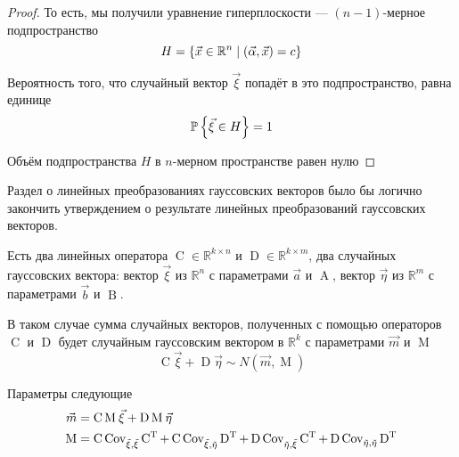 \begin{proof}
    То есть, мы получили уравнение гиперплоскости ---
    $\left( n-1 \right)$-мерное подпространство
    $$H = \left\{ \vec{x} \in \mathbb{R}^n
        \;\middle|\; \left( \vec{\alpha}, \vec{x} \right) = c \right\}$$

    Вероятность того, что случайный вектор $\vec{\xi}$ попадёт в это
    подпространство, равна единице
    $$\mathbb{P}\left\{ \vec{\xi} \in H \right\} = 1$$

    Объём подпространства $H$ в $n$-мерном пространстве равен нулю
\end{proof}

Раздел о линейных преобразованиях гауссовских векторов было бы логично закончить
утверждением о результате линейных преобразований гауссовских векторов.

\begin{affirmation}\label{affirmation:gaussianVector:linearTransformations}
    Есть два линейных оператора $\operatorname{C} \in \mathbb{R}^{k \times n}$
    и $\operatorname{D} \in \mathbb{R}^{k \times m}$,
    два случайных гауссовских вектора: вектор $\vec{\xi}$ из $\mathbb{R}^n$ с
    параметрами $\vec{a}$ и $\operatorname{A}$, вектор $\vec{\eta}$ из
    $\mathbb{R}^m$ с параметрами $\vec{b}$ и $\operatorname{B}$.

    В таком случае сумма случайных векторов, полученных с помощью операторов
    $\operatorname{C}$ и $\operatorname{D}$ будет случайным гауссовским вектором
    в $\mathbb{R}^k$ с параметрами $\vec{m}$ и $\operatorname{M}$
    $$\operatorname{C} \vec{\xi} + \operatorname{D} \vec{\eta}
        \sim N\left( \vec{m}, \operatorname{M} \right)$$

    Параметры следующие
    \begin{align*}
        \vec{m} &= \operatorname{C} \operatorname{M}_{} \vec{\xi}
            + \operatorname{D} \operatorname{M}_{} \vec{\eta} \\
        \operatorname{M} &= \operatorname{C} \operatorname{Cov^{}_{\vec{\xi}, \vec{\xi}}} \operatorname{C^T}
            + \operatorname{C} \operatorname{Cov^{}_{\vec{\xi}, \vec{\eta}}} \operatorname{D^T}
            + \operatorname{D} \operatorname{Cov^{}_{\vec{\eta}, \vec{\xi}}} \operatorname{C^T}
            + \operatorname{D} \operatorname{Cov^{}_{\vec{\eta}, \vec{\eta}}} \operatorname{D^T}
    \end{align*}
\end{affirmation}
